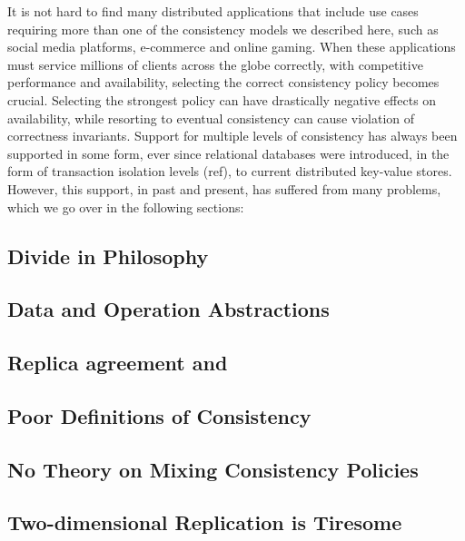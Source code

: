 It is not hard to find many distributed applications that include use cases
requiring more than one of the consistency models we described here, such as social media
platforms, e-commerce and online gaming. When these applications must service millions of
clients across the globe correctly, with competitive performance and
availability, selecting the correct consistency policy becomes crucial.
Selecting the strongest policy can have drastically negative effects on availability, while
resorting to eventual consistency can cause violation of correctness invariants.
Support for multiple levels of consistency has always been supported in some
form, ever since relational databases were introduced, in the form of
transaction isolation levels (ref), to current distributed key-value stores.
However, this support, in past and present, has suffered from many problems,
which we go over in the following sections:

\subsection{Divide in Philosophy}


\subsection{Data and Operation Abstractions}

\subsection{Replica agreement and }

\subsection{Poor Definitions of Consistency}

\subsection{No Theory on Mixing Consistency Policies}

\subsection{Two-dimensional Replication is Tiresome}







